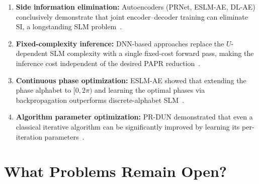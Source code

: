 \begin{enumerate}
    \item \textbf{Side information elimination:}
          Autoencoders (PRNet, ESLM-AE, DL-AE) conclusively demonstrate
          that joint encoder--decoder training can eliminate SI,
          a longstanding SLM problem~\cite{kim2017novel,hao2019extended,alnaseri2025deep}.
    \item \textbf{Fixed-complexity inference:}
          DNN-based approaches replace the $U$-dependent SLM complexity
          with a single fixed-cost forward pass, making the inference
          cost independent of the desired PAPR
          reduction~\cite{kim2017novel,zou2021novel}.
    \item \textbf{Continuous phase optimization:}
          ESLM-AE showed that extending the phase alphabet to
          $[0, 2\pi)$ and learning the optimal phases via
          backpropagation outperforms discrete-alphabet SLM~\cite{hao2019extended}.
    \item \textbf{Algorithm parameter optimization:}
          PR-DUN demonstrated that even a classical iterative algorithm
          can be significantly improved by learning its
          per-iteration parameters~\cite{nguyen2022deep}.
\end{enumerate}

\section{What Problems Remain Open?}
\label{sec:open_problems}

